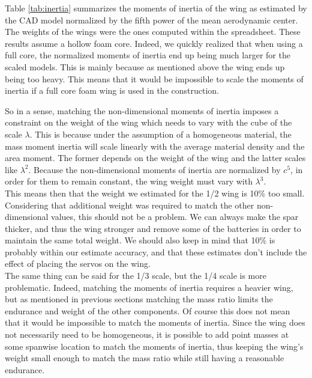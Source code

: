 \documentclass[titlepage,10pt]{article}
\begin{document}
Table \ref{tab:inertia} summarizes the moments of inertia of the wing as estimated by the CAD model normalized by the fifth power of the mean aerodynamic center. The weights of the wings were the ones computed within the spreadsheet. These results assume a hollow foam core. Indeed, we quickly realized that when using a full core, the normalized moments of inertia end up being much larger for the scaled models. This is mainly because as mentioned above the wing ends up being too heavy. This means that it would be impossible to scale the moments of inertia if a full core foam wing is used in the construction.\\
\newpage

So in a sense, matching the non-dimensional moments of inertia imposes a constraint on the weight of the wing which needs to vary with the cube of the scale $\lambda$. This is because under the assumption of a homogeneous material, the mass moment inertia will scale linearly with the average material density and the area moment. The former depends on the weight of the wing and the latter scales like $\lambda^2$. Because the non-dimensional moments of inertia are normalized by $c^5$, in order for them to remain constant, the wing weight must vary with $\lambda^3$. \\

This means then that the weight we estimated for the 1/2 wing is 10\% too small. Considering that additional weight was required to match the other non-dimensional values, this should not be a problem. We can always make the spar thicker, and thus the wing stronger and remove some of the batteries in order to maintain the same total weight. We should also keep in mind that 10\% is probably within our estimate accuracy, and that these estimates don't include the effect of placing the servos on the wing.\\

 The same thing can be said for the 1/3 scale, but the 1/4 scale is more problematic. Indeed, matching the moments of inertia requires a heavier wing, but as mentioned in previous sections matching the mass ratio limits the endurance and weight of the other components. Of course this does not mean that it would be impossible to match the moments of inertia. Since the wing does not necessarily need to be homogeneous, it is possible to add point masses at some spanwise location to match the moments of inertia, thus keeping the wing's weight small enough to match the mass ratio while still having a reasonable endurance.\\
\end{document}

